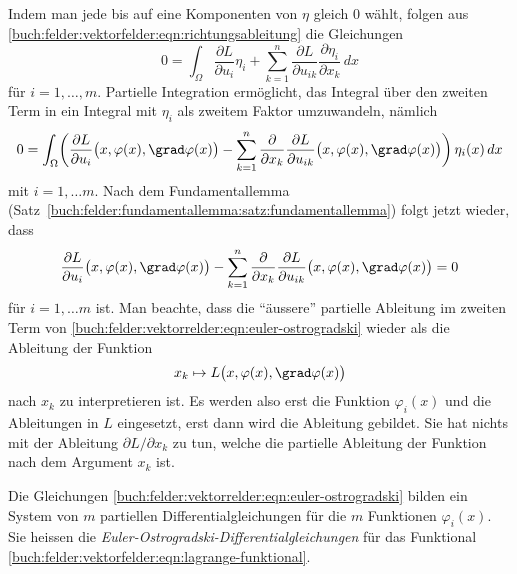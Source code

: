 Indem man jede bis auf eine Komponenten von $\eta$ gleich $0$
wählt, folgen aus
\eqref{buch:felder:vektorfelder:eqn:richtungsableitung}
die Gleichungen
\begin{equation*}
0
=
\int_{\Omega}
\frac{\partial L}{\partial u_i}
\eta_i
+
\sum_{k=1}^n
\frac{\partial L}{\partial u_{ik}}
\frac{\partial \eta_i}{\partial x_k}
\,dx
\end{equation*}
für $i=1,\dots,m$.
Partielle Integration ermöglicht, das Integral über den zweiten
Term in ein Integral mit $\eta_i$ als zweitem Faktor umzuwandeln,
nämlich
\begin{equation*}
0
=
\int_{\Omega}
\biggl(
\frac{\partial L}{\partial u_i}
\bigl(x,\varphi(x),\grad\varphi(x)\bigr)
-
\sum_{k=1}^n
\frac{\partial}{\partial x_k}
\frac{\partial L}{\partial u_{ik}}
\bigl(x,\varphi(x),\grad\varphi(x)\bigr)
\biggr)
\,
\eta_i(x)
\,dx
\end{equation*}
mit $i=1,\dots m$.
Nach dem Fundamentallemma
(Satz~\ref{buch:felder:fundamentallemma:satz:fundamentallemma})
folgt jetzt wieder, dass
\begin{equation}
\frac{\partial L}{\partial u_i}
\bigl(x,\varphi(x),\grad\varphi(x)\bigr)
-
\sum_{k=1}^n
\frac{\partial}{\partial x_k}
\frac{\partial L}{\partial u_{ik}}
\bigl(x,\varphi(x),\grad\varphi(x)\bigr)
=
0
\label{buch:felder:vektorrelder:eqn:euler-ostrogradski}
\end{equation}
für $i=1,\dots m$ ist.
Man beachte, dass die ``äussere'' partielle Ableitung im zweiten Term
von
\eqref{buch:felder:vektorrelder:eqn:euler-ostrogradski}
wieder als die Ableitung der Funktion
\[
x_k
\mapsto
L\bigl(x,\varphi(x),\grad\varphi(x)\bigr)
\]
nach $x_k$ zu interpretieren ist.
Es werden also erst die Funktion $\varphi_i(x)$ und die Ableitungen
in $L$ eingesetzt, erst dann wird die Ableitung gebildet.
Sie hat nichts mit der Ableitung $\partial L/\partial x_k$ zu tun, welche
die partielle Ableitung der Funktion nach dem Argument $x_k$ ist.


Die Gleichungen
\eqref{buch:felder:vektorrelder:eqn:euler-ostrogradski}
bilden ein System von $m$ partiellen Differentialgleichungen
für die $m$ Funktionen $\varphi_i(x)$.
Sie heissen die {\em Euler-Ostrogradski-Differentialgleichungen}
für das Funktional
\eqref{buch:felder:vektorfelder:eqn:lagrange-funktional}.



